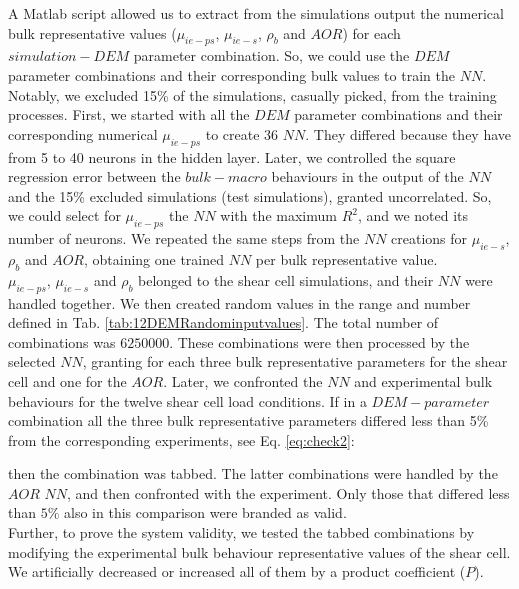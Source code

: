 A Matlab script allowed us to extract from the simulations output the numerical
bulk representative values ($\mu_{ie-ps}$, $\mu_{ie-s}$, $\rho_b$ and $AOR$) for each $simulation-DEM$ parameter combination. 
So, we could use the $DEM$ parameter combinations and their corresponding bulk values to train the $NN$. 
Notably, we excluded 15\% of the simulations, casually picked, from the training processes. 
First, we started with all the $DEM$ parameter combinations and their corresponding numerical $\mu_{ie-ps}$ to create 36 $NN$. 
They differed because they have from 5 to 40 neurons in the hidden layer. 
Later, we controlled the square regression error between the $bulk-macro$ behaviours in the output of 
the $NN$ and the 15\% excluded simulations (test simulations), granted uncorrelated. 
So, we could select for $\mu_{ie-ps}$ the $NN$ with the maximum $R^2$, and we noted its number of neurons. 
We repeated the same steps from the $NN$ creations for $\mu_{ie-s}$, $\rho_b$ and $AOR$, 
obtaining one trained $NN$ per bulk representative value. \\

$\mu_{ie-ps}$, $\mu_{ie-s}$ and $\rho_b$ belonged to the shear cell simulations,
and their $NN$ were handled together. We then created random values in the range
and number defined in Tab. \ref{tab:12DEMRandominputvalues}.
The total number of combinations was $6250000$. These combinations were then
processed by the selected $NN$, granting for each three bulk representative parameters for the shear cell and one for the $AOR$. Later, we confronted the $NN$ and experimental bulk behaviours for the twelve shear cell load conditions. 
If in a $DEM-parameter$ combination all the three bulk representative parameters differed less 
than 5\% from the corresponding experiments, see Eq. \ref{eq:check2}:

then the combination was tabbed. The latter combinations were handled by the $AOR$ $NN$, and then confronted with the experiment. 
Only those that differed less than $5\%$ also in this comparison were branded as
valid.\\
Further, to prove the system validity, we tested the tabbed combinations by modifying the experimental bulk
behaviour representative values of the shear cell. 
We artificially decreased or increased all of them by a product coefficient ($P$).

